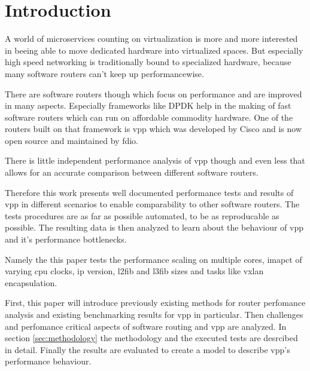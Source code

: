 \chapter{Introduction}


A world of microservices counting on virtualization is more and
more interested in beeing able to move dedicated hardware into
virtualized spaces. But especially high speed networking is
traditionally bound to specialized hardware, because many software
routers can't keep up performancewise.


There are software routers though which focus on performance and are
improved in many aspects. Especially frameworks like DPDK help in the
making of fast software routers which can run on affordable commodity
hardware. One of the routers built on that framework is \Ac{vpp} which
was developed by Cisco and is now open source and maintained by
\Ac{fdio}.


There is little independent performance analysis of \Ac{vpp} though and even less that allows for an accurate comparison between different software routers. 



Therefore this work presents well documented performance tests and
results of \Ac{vpp} in different scenarios to enable comparability to
other software routers. The tests procedures are as far as possible
automated, to be as reproducable as possible. The resulting data is
then analyzed to learn about the behaviour of \Ac{vpp} and it's
performance bottlenecks. 


Namely the this paper tests the performance scaling on multiple cores, imapct of varying cpu clocks, ip version, l2fib and l3fib sizes and tasks like vxlan encapsulation. 


First, this paper will introduce previously existing methods for
router perfomance analysis and existing benchmarking results for
\Ac{vpp} in particular. Then challenges and perfomance critical
aspects of software routing and \Ac{vpp} are analyzed. In section
\ref{sec:methodology} the methodology and the executed tests are
desrcibed in detail. Finally the results are evaluated to create a
model to describe \Ac{vpp}'s performance behaviour.
